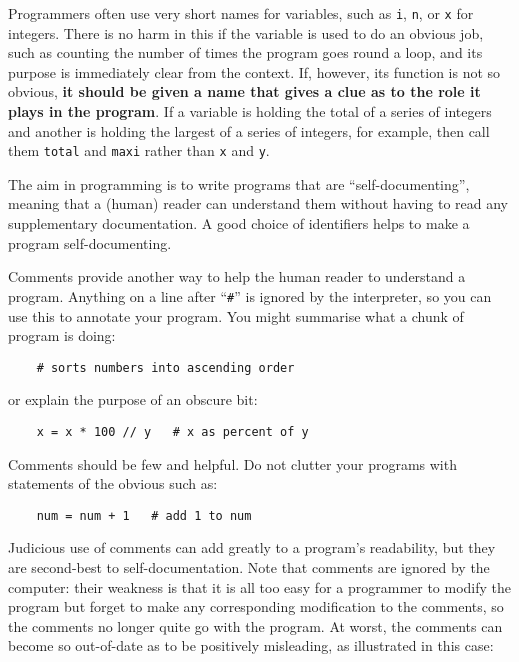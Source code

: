 Programmers often use very short names for variables, such as
\verb!i!, \verb!n!, or 
\verb!x! for integers.  There is no harm in this if the variable is used to
do an obvious job, such as counting the number of times the program goes round
a loop, and its purpose is immediately clear from the context.  If, however, its
function is not so obvious, \textbf{it should be given a name that
gives a clue as to the role it plays in the program}.  If a variable is
holding the total of a series of integers and another is holding the
largest of a series of integers, for example, then call them \verb!total!
and \verb!maxi! rather than \verb!x! and \verb!y!.

The aim in programming is to write programs that are ``self-documenting'',
meaning that a (human) reader can understand them without having to read
any supplementary documentation.  A good choice of identifiers helps to
make a program self-documenting.

Comments provide another way to help the human reader to understand a
program.  Anything on a line after ``\texttt{\#}'' is ignored by the interpreter,
so you can use this to annotate your program.  You might summarise
what a chunk of program is doing:

\begin{Verbatim}
    # sorts numbers into ascending order
\end{Verbatim}

or explain the purpose of an obscure bit:

\begin{Verbatim}
    x = x * 100 // y   # x as percent of y
\end{Verbatim}

Comments should be few and helpful.  Do not clutter your programs with
statements of the obvious such as:

\begin{Verbatim}
    num = num + 1   # add 1 to num
\end{Verbatim}

Judicious use of comments can add greatly to a program's readability, but they
are second-best to self-documentation. Note that comments are %
ignored by the computer: their weakness is that it is all too
easy for a programmer to modify the program but forget to make any
corresponding modification to the comments, so the comments no longer quite
go with the program. At worst, the comments can become so out-of-date as
to be positively misleading, as illustrated in this case: 

